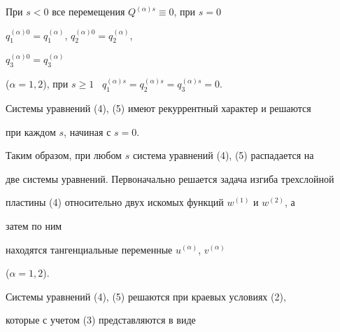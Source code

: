 При $s<0$ все перемещения $Q^{(\alpha)s}\equiv0$, при $s=0$ \


$q^{(\alpha)0}_1=q^{(\alpha)}_1$, $q^{(\alpha)0}_2=q^{(\alpha)}_2$, 


$q^{(\alpha)0}_3=q^{(\alpha)}_3$ 


($\alpha=1,2$), при $s\ge1$ \ $q^{(\alpha)s}_1= q^{(\alpha)s}_2= 


q^{(\alpha)s}_3=0$. 


 


Системы уравнений (4), (5) имеют рекуррентный характер и решаются 


при каждом $s$, начиная с $s=0$. 


 


Таким образом, при любом $s$ система уравнений (4), (5) распадается на 


две системы уравнений. Первоначально решается задача изгиба трехслойной 


пластины (4) относительно двух искомых функций $w^{(1)}$ и $w^{(2)}$, а 


затем по ним 


находятся тангенциальные переменные $u^{(\alpha)}$, $v^{(\alpha)}$ 


($\alpha=1,2$). 


 


Системы уравнений (4), (5) решаются при краевых условиях (2), 


которые с учетом (3) представляются в виде 


